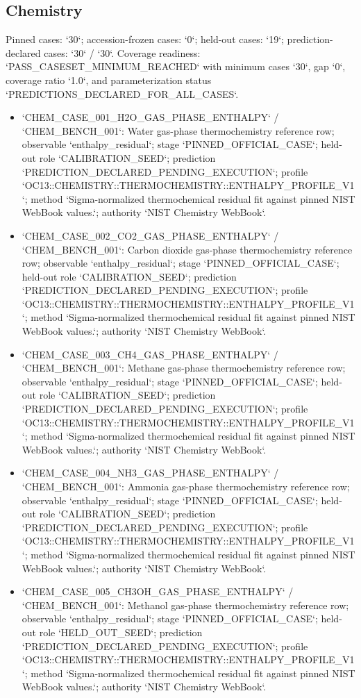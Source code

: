 \subsection{Chemistry}
Pinned cases: `30`; accession-frozen cases: `0`; held-out cases: `19`; prediction-declared cases: `30` / `30`.
Coverage readiness: `PASS\_CASESET\_MINIMUM\_REACHED` with minimum cases `30`, gap `0`, coverage ratio `1.0`, and parameterization status `PREDICTIONS\_DECLARED\_FOR\_ALL\_CASES`.
\begin{itemize}
\item `CHEM\_CASE\_001\_H2O\_GAS\_PHASE\_ENTHALPY` / `CHEM\_BENCH\_001`: Water gas-phase thermochemistry reference row; observable `enthalpy\_residual`; stage `PINNED\_OFFICIAL\_CASE`; held-out role `CALIBRATION\_SEED`; prediction `PREDICTION\_DECLARED\_PENDING\_EXECUTION`; profile `OC13::CHEMISTRY::THERMOCHEMISTRY::ENTHALPY\_PROFILE\_V1`; method `Sigma-normalized thermochemical residual fit against pinned NIST WebBook values.`; authority `NIST Chemistry WebBook`.
\item `CHEM\_CASE\_002\_CO2\_GAS\_PHASE\_ENTHALPY` / `CHEM\_BENCH\_001`: Carbon dioxide gas-phase thermochemistry reference row; observable `enthalpy\_residual`; stage `PINNED\_OFFICIAL\_CASE`; held-out role `CALIBRATION\_SEED`; prediction `PREDICTION\_DECLARED\_PENDING\_EXECUTION`; profile `OC13::CHEMISTRY::THERMOCHEMISTRY::ENTHALPY\_PROFILE\_V1`; method `Sigma-normalized thermochemical residual fit against pinned NIST WebBook values.`; authority `NIST Chemistry WebBook`.
\item `CHEM\_CASE\_003\_CH4\_GAS\_PHASE\_ENTHALPY` / `CHEM\_BENCH\_001`: Methane gas-phase thermochemistry reference row; observable `enthalpy\_residual`; stage `PINNED\_OFFICIAL\_CASE`; held-out role `CALIBRATION\_SEED`; prediction `PREDICTION\_DECLARED\_PENDING\_EXECUTION`; profile `OC13::CHEMISTRY::THERMOCHEMISTRY::ENTHALPY\_PROFILE\_V1`; method `Sigma-normalized thermochemical residual fit against pinned NIST WebBook values.`; authority `NIST Chemistry WebBook`.
\item `CHEM\_CASE\_004\_NH3\_GAS\_PHASE\_ENTHALPY` / `CHEM\_BENCH\_001`: Ammonia gas-phase thermochemistry reference row; observable `enthalpy\_residual`; stage `PINNED\_OFFICIAL\_CASE`; held-out role `CALIBRATION\_SEED`; prediction `PREDICTION\_DECLARED\_PENDING\_EXECUTION`; profile `OC13::CHEMISTRY::THERMOCHEMISTRY::ENTHALPY\_PROFILE\_V1`; method `Sigma-normalized thermochemical residual fit against pinned NIST WebBook values.`; authority `NIST Chemistry WebBook`.
\item `CHEM\_CASE\_005\_CH3OH\_GAS\_PHASE\_ENTHALPY` / `CHEM\_BENCH\_001`: Methanol gas-phase thermochemistry reference row; observable `enthalpy\_residual`; stage `PINNED\_OFFICIAL\_CASE`; held-out role `HELD\_OUT\_SEED`; prediction `PREDICTION\_DECLARED\_PENDING\_EXECUTION`; profile `OC13::CHEMISTRY::THERMOCHEMISTRY::ENTHALPY\_PROFILE\_V1`; method `Sigma-normalized thermochemical residual fit against pinned NIST WebBook values.`; authority `NIST Chemistry WebBook`.

\end{itemize}
